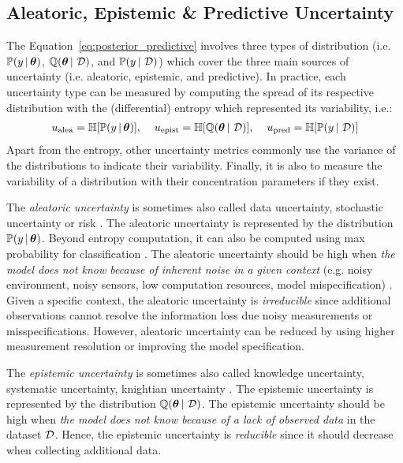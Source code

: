 \subsection{Aleatoric, Epistemic \& Predictive Uncertainty}

The Equation~\ref{eq:posterior_predictive} involves three types of distribution (i.e. $\mathbb{P}(y \,|\, \bm{\theta})$, $\operatorname{\mathbb{Q}}(\bm{\theta} \,|\, \operatorname{\mathcal{D}})$, and $\mathbb{P}(y \,|\, \operatorname{\mathcal{D}})$) which cover the three main sources of uncertainty (i.e. aleatoric, epistemic, and predictive).
In practice, each uncertainty type can be measured by computing the spread of its respective distribution with the (differential) entropy which represented its variability, i.e.:
\begin{align}
     u_\text{alea} = \operatorname{\mathbb{H}}[\mathbb{P}(y \,|\, \bm{\theta})], \hspace{4mm}
     u_\text{epist} = \operatorname{\mathbb{H}}[\operatorname{\mathbb{Q}}(\bm{\theta} \,|\, \operatorname{\mathcal{D}})], \hspace{4mm}
     u_\text{pred} = \operatorname{\mathbb{H}}[\mathbb{P}(y \,|\, \operatorname{\mathcal{D}})]
\end{align}
Apart from the entropy, other uncertainty metrics commonly use the variance of the distributions to indicate their variability. Finally, it is also to measure the variability of a distribution with their concentration parameters if they exist.

The \emph{aleatoric uncertainty} is sometimes also called data uncertainty, stochastic uncertainty or risk \cite{hullermeier2021aleatoric,knight1921, malini2018}. 
The aleatoric uncertainty is represented by the distribution $\mathbb{P}(y \,|\, \bm{\theta})$.
Beyond entropy computation, it can also be computed using max probability for classification \cite{malini2018}.
The aleatoric uncertainty should be high when \emph{the model does not know because of inherent noise in a given context} (e.g. noisy environment, noisy sensors, low computation resources, model mispecification) \cite{wenger2022posterior, hullermeier2021aleatoric}.
Given a specific context, the aleatoric uncertainty is \emph{irreducible} since additional observations cannot resolve the information loss due noisy measurements or misspecifications. 
However, aleatoric uncertainty can be reduced by using higher measurement resolution or improving the model specification. 

The \emph{epistemic uncertainty} is sometimes also called knowledge uncertainty, systematic uncertainty, knightian uncertainty \cite{hullermeier2021aleatoric,knight1921,malini2018}.
The epistemic uncertainty is represented by the distribution $\operatorname{\mathbb{Q}}(\bm{\theta} \,|\, \operatorname{\mathcal{D}})$.
The epistemic uncertainty should be high when \emph{the model does not know because of a lack of observed data} in the dataset $\operatorname{\mathcal{D}}$.
Hence, the epistemic uncertainty is \emph{reducible} since it should decrease when collecting additional data.

